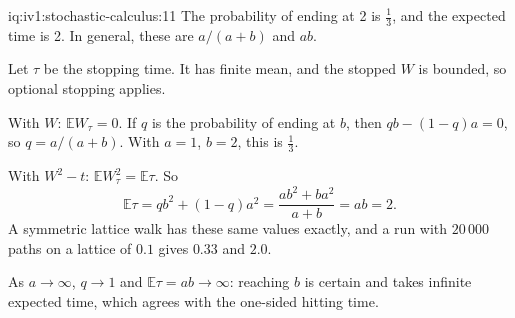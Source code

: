 \begin{solution}{iq:iv1:stochastic-calculus:11}
The probability of ending at 2 is $\frac13$, and the expected time is 2. In general, these are $a/(a + b)$ and $ab$.

Let $\tau$ be the stopping time. It has finite mean, and the stopped $W$ is bounded, so optional stopping applies.

With $W$: $\mathbb{E}W_\tau = 0$. If $q$ is the probability of ending at $b$, then $qb - (1 - q)a = 0$, so $q = a/(a + b)$. With $a = 1$, $b = 2$, this is $\frac13$.

With $W^2 - t$: $\mathbb{E}W_\tau^2 = \mathbb{E}\tau$. So
\[
\mathbb{E}\tau = qb^2 + (1 - q)a^2 = \frac{ab^2 + ba^2}{a + b} = ab = 2.
\]
A symmetric lattice walk has these same values exactly, and a run with $20\,000$ paths on a lattice of $0.1$ gives $0.33$ and $2.0$.

As $a \to \infty$, $q \to 1$ and $\mathbb{E}\tau = ab \to \infty$: reaching $b$ is certain and takes infinite expected time, which agrees with the one-sided hitting time.



\end{solution}

